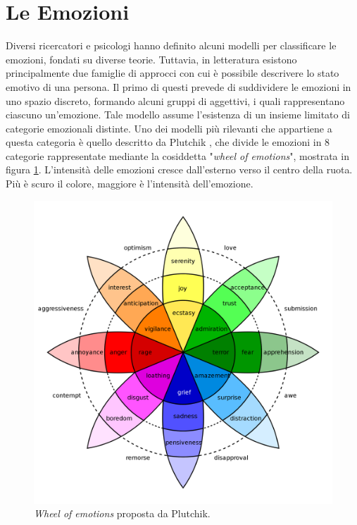 \documentclass[11pt]{report}
\begin{document}



\section{Le Emozioni}


Diversi ricercatori e psicologi hanno definito alcuni modelli per classificare le emozioni, fondati su diverse teorie. Tuttavia, in letteratura esistono principalmente due famiglie di approcci con cui è possibile descrivere lo stato emotivo di una persona. Il primo di questi prevede di suddividere le emozioni in uno spazio discreto, formando alcuni gruppi di aggettivi, i quali rappresentano ciascuno un'emozione. Tale modello assume l'esistenza di un insieme limitato di categorie emozionali distinte. Uno dei modelli più rilevanti che appartiene a questa categoria è quello descritto da Plutchik \cite{plutchik2013theories}, che divide le emozioni in 8 categorie rappresentate mediante la cosiddetta "\textit{wheel of emotions}", mostrata in figura \ref{fig:wheel}. L'intensità delle emozioni cresce dall'esterno verso il centro della ruota. Più è scuro il colore, maggiore è l'intensità dell'emozione.

\begin{figure}[h]
    \centering
    \includegraphics[scale = 0.15]{img/Plutchik-wheel.svg.png}
    \caption[\textit{Wheel of emotions} proposta da Plutchik.]{\textit{Wheel of emotions} proposta da Plutchik.\footnotemark}
    \label{fig:wheel}
\end{figure}
\end{document}
